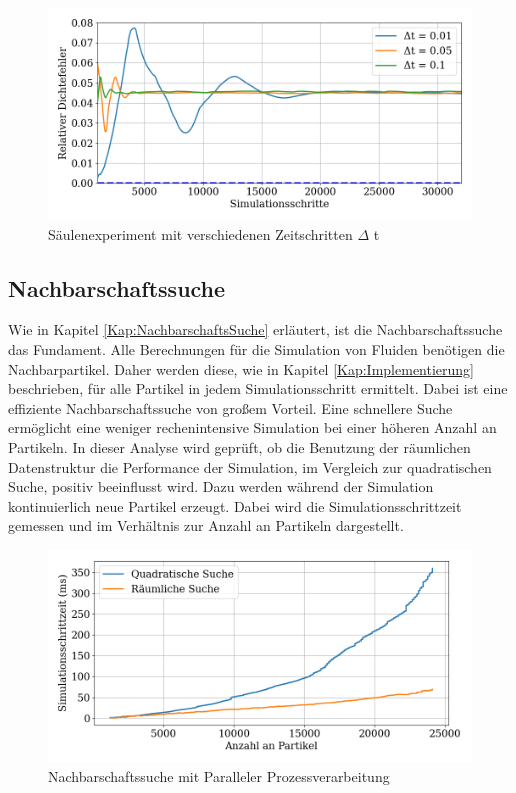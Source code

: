 \documentclass[a4paper, 12pt]{article}
\begin{document}
\begin{figure}[H]
	\centering
	\includegraphics[width=.85\textwidth]{graphics/Zeitschritt.png}	
	\caption{Säulenexperiment mit verschiedenen Zeitschritten $\Delta$ t}
	\label{Säulenexperiment_t}
\end{figure}

\subsection{Nachbarschaftssuche}
Wie in Kapitel \ref{Kap:NachbarschaftsSuche} erläutert, ist die Nachbarschaftssuche das Fundament. Alle Berechnungen für die Simulation von Fluiden benötigen die Nachbarpartikel. Daher werden diese, wie in Kapitel \ref{Kap:Implementierung} beschrieben, für alle Partikel in jedem Simulationsschritt ermittelt. Dabei ist eine effiziente Nachbarschaftssuche von großem Vorteil. Eine schnellere Suche ermöglicht eine weniger rechenintensive Simulation bei einer höheren Anzahl an Partikeln. In dieser Analyse wird geprüft, ob die Benutzung der räumlichen Datenstruktur die Performance der Simulation, im Vergleich zur quadratischen Suche, positiv beeinflusst wird. Dazu werden während der Simulation kontinuierlich neue Partikel erzeugt. Dabei wird die Simulationsschrittzeit gemessen und im Verhältnis zur Anzahl an Partikeln dargestellt.

\begin{figure}[H]
	\centering
	\includegraphics[width=.85\textwidth]{graphics/Nachbarschafts-Suche.png}
	\caption{Nachbarschaftssuche mit Paralleler Prozessverarbeitung}
	\label{NachbarschaftsSuche}
\end{figure}
\end{document}
